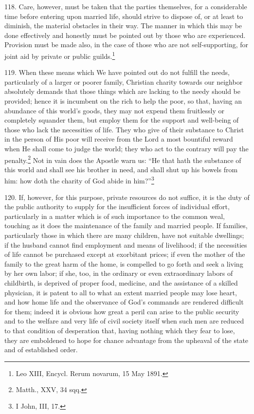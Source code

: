 \documentclass[12pt,a4paper]{book}
\begin{document}
118. Care, however, must be taken that the parties themselves, for a considerable time before entering upon married life, should strive to dispose of, or at least to diminish, the material obstacles in their way. The manner in which this may be done effectively and honestly must be pointed out by those who are experienced. Provision must be made also, in the case of those who are not self-supporting, for joint aid by private or public guilds.\footnote{Leo XIII, Encycl. Rerum novarum, 15 May 1891.}

119. When these means which We have pointed out do not fulfill the needs, particularly of a larger or poorer family, Christian charity towards our neighbor absolutely demands that those things which are lacking to the needy should be provided; hence it is incumbent on the rich to help the poor, so that, having an abundance of this world's goods, they may not expend them fruitlessly or completely squander them, but employ them for the support and well-being of those who lack the necessities of life. They who give of their substance to Christ in the person of His poor will receive from the Lord a most bountiful reward when He shall come to judge the world; they who act to the contrary will pay the penalty.\footnote{Matth., XXV, 34 sqq.} Not in vain does the Apostle warn us: ``He that hath the substance of this world and shall see his brother in need, and shall shut up his bowels from him: how doth the charity of God abide in him?''\footnote{I John, III, 17.}

120. If, however, for this purpose, private resources do not suffice, it is the duty of the public authority to supply for the insufficient forces of individual effort, particularly in a matter which is of such importance to the common weal, touching as it does the maintenance of the family and married people. If families, particularly those in which there are many children, have not suitable dwellings; if the husband cannot find employment and means of livelihood; if the necessities of life cannot be purchased except at exorbitant prices; if even the mother of the family to the great harm of the home, is compelled to go forth and seek a living by her own labor; if she, too, in the ordinary or even extraordinary labors of childbirth, is deprived of proper food, medicine, and the assistance of a skilled physician, it is patent to all to what an extent married people may lose heart, and how home life and the observance of God's commands are rendered difficult for them; indeed it is obvious how great a peril can arise to the public security and to the welfare and very life of civil society itself when such men are reduced to that condition of desperation that, having nothing which they fear to lose, they are emboldened to hope for chance advantage from the upheaval of the state and of established order.
\end{document}
